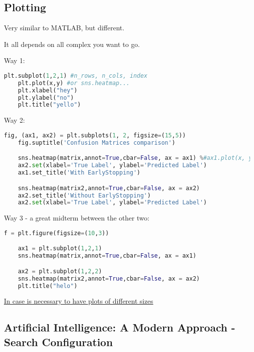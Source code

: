 \subsection{Plotting}

Very similar to MATLAB, but different.


It all depends on all complex you want to go.

Way 1:
\begin{lstlisting}[language=python]
    plt.subplot(1,2,1) #n_rows, n_cols, index
    plt.plot(x,y) #or sns.heatmap...
    plt.xlabel("hey")
    plt.ylabel("no")
    plt.title("yello")
\end{lstlisting}


Way 2:
\begin{lstlisting}[language=python]
    fig, (ax1, ax2) = plt.subplots(1, 2, figsize=(15,5))
    fig.suptitle('Confusion Matrices comparison')

    sns.heatmap(matrix,annot=True,cbar=False, ax = ax1) %#ax1.plot(x, y)
    ax2.set(xlabel='True Label', ylabel='Predicted Label')
    ax1.set_title('With EarlyStopping')

    sns.heatmap(matrix2,annot=True,cbar=False, ax = ax2)
    ax2.set_title('Without EarlyStopping')
    ax2.set(xlabel='True Label', ylabel='Predicted Label')
\end{lstlisting}


Way 3 - a great midterm between the other two:
\begin{lstlisting}[language=python]
    f = plt.figure(figsize=(10,3))

    ax1 = plt.subplot(1,2,1)
    sns.heatmap(matrix,annot=True,cbar=False, ax = ax1)

    ax2 = plt.subplot(1,2,2)
    sns.heatmap(matrix2,annot=True,cbar=False, ax = ax2)
    plt.title("helo")    
\end{lstlisting}




\href{https://stackoverflow.com/questions/10388462/matplotlib-different-size-subplots}{\ul{In case is necessary to have plots of different sizes}}












\subsection{Artificial Intelligence: A Modern Approach - Search Configuration}

